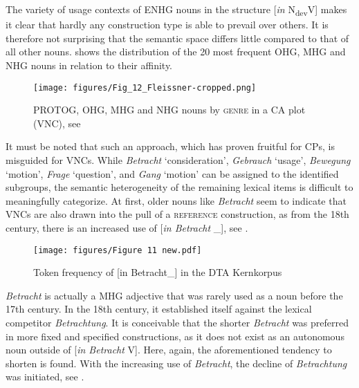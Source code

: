 \documentclass[output=paper,colorlinks,citecolor=brown]{langscibook}
\begin{document}
The variety of usage contexts of ENHG nouns in the structure [\textit{in} N\textsubscript{dev}V] makes it clear that hardly any construction type is able to prevail over others. It is therefore not surprising that the semantic space differs little compared to that of all other nouns.  shows the distribution of the 20 most frequent OHG, MHG and NHG nouns in relation to their  affinity.

\begin{figure}
    \centering
    \texttt{[image: figures/Fig\_12\_Fleissner-cropped.png]}
    \caption{PROTOG, OHG, MHG and NHG nouns by \textsc{genre} \textup{in a CA plot (VNC)}, see }
    \label{fig:fleissner:10}
\end{figure}
 
It must be noted that such an approach, which has proven fruitful for CPs, is misguided for VNCs. While \textit{Betracht} ‘consideration', \textit{Gebrauch} ‘usage', \textit{Bewegung} ‘motion', \textit{Frage} ‘question', and \textit{Gang} ‘motion' can be assigned to the identified subgroups, the semantic heterogeneity of the remaining lexical items is difficult to meaningfully categorize. At first, older nouns like \textit{Betracht} seem to indicate that VNCs are also drawn into the pull of a \textsc{reference} construction, as from the 18th century, there is an increased use of [\textit{in Betracht} \_], see .

 \begin{figure}
     \texttt{[image: figures/Figure 11 new.pdf]}
     \caption{Token frequency of [in Betracht\_\textup{] in the DTA Kernkorpus}}
     \label{fig:fleissner:11}
 \end{figure}
\largerpage
\textit{Betracht} is actually a MHG adjective that was rarely used as a noun before the 17th century. In the 18th century, it established itself against the lexical competitor \textit{Betrachtung}. It is conceivable that the shorter \textit{Betracht} was preferred in more fixed and specified constructions, as it does not exist as an autonomous noun outside of [\textit{in Betracht} V]. Here, again, the aforementioned tendency to shorten is found. With the increasing use of \textit{Betracht}, the decline of \textit{Betrachtung} was initiated, see .
\end{document}
